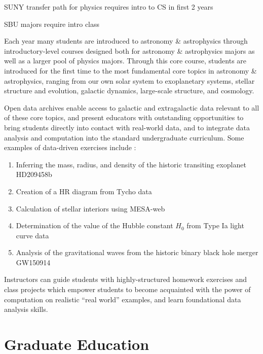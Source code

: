 \documentclass[11pt]{article}
\begin{document}
SUNY transfer path for physics requires intro to CS in first 2 years

 SBU majors require intro class

Each year many students are introduced to astronomy \& astrophysics through
introductory-level courses designed both for astronomy \& astrophysics majors
as well as a larger pool of physics majors. Through this core course, students
are introduced for the first time to the most fundamental core topics in astronomy 
\& astrophysics, ranging from our own solar system to exoplanetary systems, 
stellar structure and evolution, galactic dynamics, large-scale structure, and cosmology.

Open data archives enable access to galactic and extragalactic data relevant to all of these
core topics, and present educators with outstanding opportunities to bring students directly
into contact with real-world data, and to integrate data analysis  and computation into the
standard undergraduate curriculum. Some examples of data-driven exercises include :


\begin {enumerate} 

\item Inferring the mass, radius, and density of the historic transiting exoplanet HD209458b

\item Creation of a HR diagram from Tycho data

\item Calculation of stellar interiors using MESA-web

\item Determination of the value of the Hubble constant $H_0$ from Type Ia light curve data

\item Analysis of the gravitational waves from the historic binary black hole merger GW150914

\end {enumerate}

Instructors can guide students with highly-structured homework exercises and class projects which 
empower students to become acquainted with the power of computation on realistic ``real world''
examples, and learn foundational data analysis skills.  


\section{Graduate Education}
\end{document}
